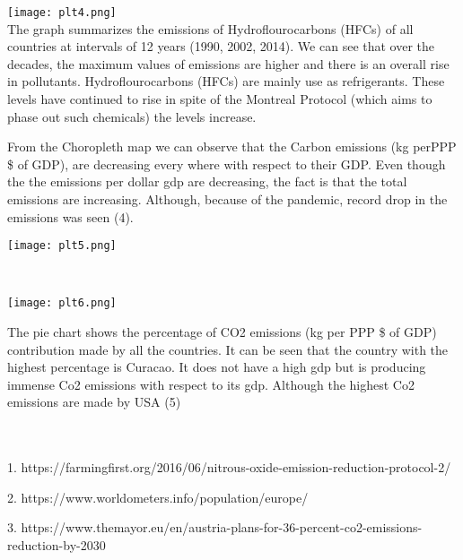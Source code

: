 \documentclass[a4paper, 11pt]{report}
\begin{document}
    \begin{multicols}{2}
     \texttt{[image: plt4.png]}
     ~\\

     The graph summarizes the emissions of Hydroflourocarbons (HFCs) of all countries at intervals of 12 years (1990, 2002, 2014). We can see that over the decades, the maximum values of emissions are higher and there is an overall rise in pollutants. Hydroflourocarbons (HFCs) are mainly use as refrigerants. These levels have continued to rise in spite of the Montreal Protocol (which aims to phase out such chemicals) the levels increase.\\

    \end{multicols}

    \newpage

    \begin{multicols}{2}
     \item From the Choropleth map we can observe that the Carbon emissions  (kg perPPP \$ of GDP), are decreasing every where with respect to their GDP. Even though the the emissions per dollar gdp are decreasing, the fact is that the total emissions are increasing. Although, because of the pandemic, record drop in the emissions was seen (4).

    \texttt{[image: plt5.png]}
    \end{multicols}~\\

    \begin{multicols}{2}
      \texttt{[image: plt6.png]}

      The pie chart shows the percentage of CO2 emissions (kg per PPP \$ of GDP) contribution made by all the countries. It can be seen that the country with the highest percentage is Curacao. It does not have a high gdp but is producing immense Co2 emissions with respect to its gdp. Although the highest Co2 emissions are made by USA (5)



    \end{multicols}


~\\\\
     \scriptsize
     1. https://farmingfirst.org/2016/06/nitrous-oxide-emission-reduction-protocol-2/

     2. https://www.worldometers.info/population/europe/

     3. https://www.themayor.eu/en/austria-plans-for-36-percent-co2-emissions-reduction-by-2030
\end{document}
